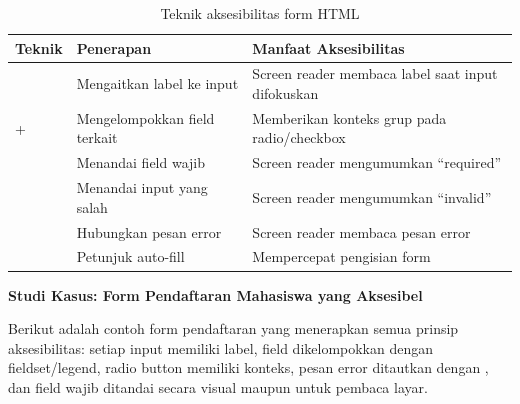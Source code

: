 \begin{table}[H]
\centering
\begin{tabular}{|P{3.5cm}|P{3.5cm}|P{5cm}|}
\hline
\textbf{Teknik} & \textbf{Penerapan} & \textbf{Manfaat Aksesibilitas} \\
\hline
{} & Mengaitkan label ke input & Screen reader membaca label saat input difokuskan \\
\hline
{} +  & Mengelompokkan field terkait & Memberikan konteks grup pada radio/checkbox \\
\hline
{} & Menandai field wajib & Screen reader mengumumkan ``required'' \\
\hline
{} & Menandai input yang salah & Screen reader mengumumkan ``invalid'' \\
\hline
{} & Hubungkan pesan error & Screen reader membaca pesan error \\
\hline
{} & Petunjuk auto-fill & Mempercepat pengisian form \\
\hline
\end{tabular}
\caption{Teknik aksesibilitas form HTML}
\end{table}

\begin{contoh}
\textbf{Studi Kasus: Form Pendaftaran Mahasiswa yang Aksesibel}

Berikut adalah contoh form pendaftaran yang menerapkan semua prinsip aksesibilitas: setiap input memiliki label, field dikelompokkan dengan fieldset/legend, radio button memiliki konteks, pesan error ditautkan dengan , dan field wajib ditandai secara visual maupun untuk pembaca layar.
\end{contoh}

